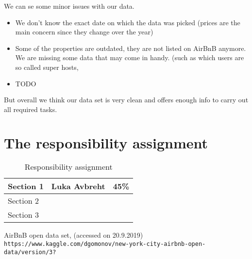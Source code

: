 \documentclass[]{report}
\begin{document}
We can se some minor issues with our data. 
\begin{itemize}
	\item We don't know the exact date on which the data was picked (prices are the main concern since they change over the year)
	\item Some of the properties are outdated, they are not listed on AirBnB anymore. We are missing some data that may come in handy. (such as which users are so called super hosts, \item TODO %
\end{itemize}
But overall we think our data set is very clean and offers enough info to carry out all required tasks. 


\section{The responsibility assignment}

\begin{table}[!h]
	\caption{Responsibility assignment}
	\begin{tabularx}{\textwidth}{|X|l|l|} \hline
		Section 1 & Luka Avbreht & 45\% \\ \hline
		Section 2 &  &  \\ \hline
		Section 3 &  &  \\ \hline
	\end{tabularx}
\end{table}

\begin{thebibliography}{1}
%	
	
	AirBnB open data set, (accessed on 20.9.2019)
	\\\texttt{https://www.kaggle.com/dgomonov/new-york-city-airbnb-open-data/version/3?}
\end{thebibliography}
\end{document}
